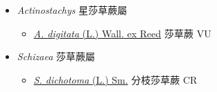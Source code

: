 
  \begin{itemize}
 \item[] \textit{Actinostachys} 星莎草蕨屬
                    
  \begin{itemize}
        \item[] \href{http://www.theplantlist.org/tpl1.1/search?q=Actinostachys+digitata}{\textit{A. digitata} (L.) Wall. ex Reed}     莎草蕨 VU
  \end{itemize}
 \item[] \textit{Schizaea} 莎草蕨屬
                    
  \begin{itemize}
        \item[] \href{http://www.theplantlist.org/tpl1.1/search?q=Schizaea+dichotoma}{\textit{S. dichotoma} (L.) Sm.}   分枝莎草蕨 CR
  \end{itemize}
  \end{itemize}

